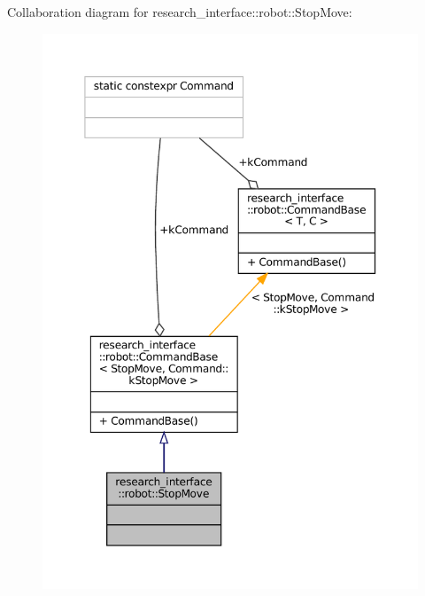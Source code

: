 Collaboration diagram for research\+\_\+interface\+:\+:robot\+:\+:Stop\+Move\+:
\nopagebreak
\begin{figure}[H]
\begin{center}
\leavevmode
\includegraphics[width=350pt]{structresearch__interface_1_1robot_1_1StopMove__coll__graph}
\end{center}
\end{figure}
